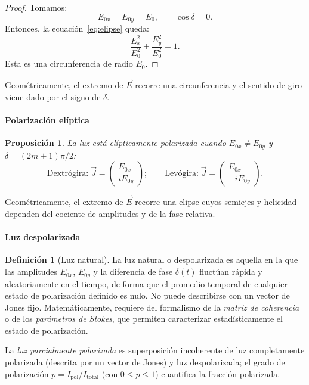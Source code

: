 \documentclass[12pt, a4paper]{article}
\theoremstyle{plain}
\newtheorem{proposicion}[teorema]{Proposición}
\theoremstyle{definition}
\newtheorem{definicion}[teorema]{Definición}
\theoremstyle{remark}
\newcommand{\ve}[1]{\vec{#1}}
\begin{document}
\begin{proof}
Tomamos:
\[
  E_{0x}=E_{0y}=E_0,
  \qquad
  \cos\delta=0.
\]
Entonces, la ecuación~\eqref{eq:elipse} queda:
\[
  \frac{E_x^2}{E_0^2} + \frac{E_y^2}{E_0^2} = 1.
\]
Esta es una circunferencia de radio $E_0$.
\end{proof}
Geométricamente, el extremo de $\ve{E}$ recorre una circunferencia y el
sentido de giro viene dado por el signo de $\delta$.

\paragraph{Polarización elíptica}

\begin{proposicion}
La luz está elípticamente polarizada cuando $E_{0x}\neq E_{0y}$ y
$\delta=(2m+1)\pi/2$:
\begin{equation}
  \text{Dextrógira:}\;
    \ve{J}=\begin{pmatrix}E_{0x}\\iE_{0y}\end{pmatrix};\qquad
  \text{Levógira:}\;
    \ve{J}=\begin{pmatrix}E_{0x}\\-iE_{0y}\end{pmatrix}.
  \label{eq:jones_elip}
\end{equation}
\end{proposicion}
Geométricamente, el extremo de $\ve{E}$ recorre una elipse cuyos semiejes y
helicidad dependen del cociente de amplitudes y de la fase relativa.

\paragraph{Luz despolarizada}

\begin{definicion}[Luz natural]
La luz natural o despolarizada es aquella en la que las amplitudes $E_{0x}$,
$E_{0y}$ y la diferencia de fase $\delta(t)$ fluctúan rápida y aleatoriamente
en el tiempo, de forma que el promedio temporal de cualquier estado de
polarización definido es nulo. No puede describirse con un vector de Jones fijo.
Matemáticamente, requiere del formalismo de la \emph{matriz de coherencia} o
de los \emph{parámetros de Stokes}, que permiten caracterizar estadísticamente
el estado de polarización.

La \emph{luz parcialmente polarizada} es superposición incoherente de luz
completamente polarizada (descrita por un vector de Jones) y luz despolarizada;
el grado de polarización $p = I_\text{pol}/I_\text{total}$ (con $0 \leq p \leq 1$)
cuantifica la fracción polarizada.
\end{definicion}
\end{document}
